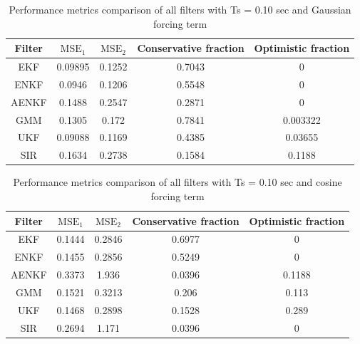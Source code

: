 \documentclass[]{article}
\begin{document}
\begin{table}[h!]
\centering
\begin{tabular}{|c|c|c|c|c|}
\hline
Filter & $\mathrm{MSE}_1$ & $\mathrm{MSE}_2$ & Conservative fraction & Optimistic fraction \\
\hline
EKF &  0.09895 &   0.1252 &   0.7043 &        0 \\
\hline
ENKF &   0.0946 &   0.1206 &   0.5548 &        0 \\
\hline
AENKF &   0.1488 &   0.2547 &   0.2871 &        0 \\
\hline
GMM &   0.1305 &    0.172 &   0.7841 & 0.003322 \\
\hline
UKF &  0.09088 &   0.1169 &   0.4385 &  0.03655 \\
\hline
SIR &   0.1634 &   0.2738 &   0.1584 &   0.1188 \\
\hline
\end{tabular}
\caption{Performance metrics comparison of all filters with Ts = 0.10 sec and Gaussian forcing term}
\label{table:compare_case_1_sample_0}
\end{table}


\begin{table}[h!]
\centering
\begin{tabular}{|c|c|c|c|c|}
\hline
Filter & $\mathrm{MSE}_1$ & $\mathrm{MSE}_2$ & Conservative fraction & Optimistic fraction \\
\hline
EKF &   0.1444 &   0.2846 &   0.6977 &        0 \\
\hline
ENKF &   0.1455 &   0.2856 &   0.5249 &        0 \\
\hline
AENKF &   0.3373 &    1.936 &   0.0396 &   0.1188 \\
\hline
GMM &   0.1521 &   0.3213 &    0.206 &    0.113 \\
\hline
UKF &   0.1468 &   0.2898 &   0.1528 &    0.289 \\
\hline
SIR &   0.2694 &    1.171 &   0.0396 &        0 \\
\hline
\end{tabular}
\caption{Performance metrics comparison of all filters with Ts = 0.10 sec and cosine forcing term}
\label{table:compare_case_2_sample_0}
\end{table}
\end{document}
